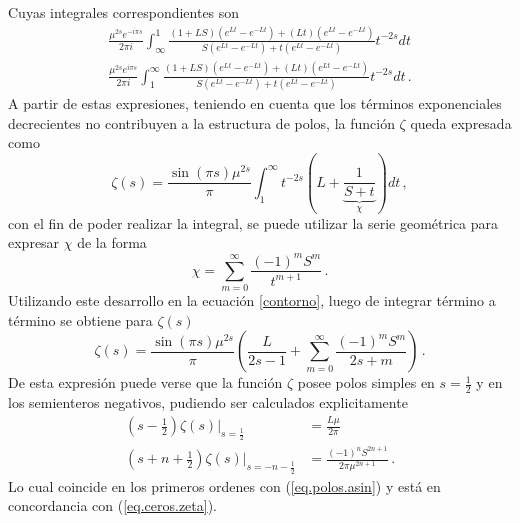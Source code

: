 Cuyas integrales correspondientes son
\begin{align}
\label{eq.tirados}
\frac{\mu ^{2s} e ^{-i \pi s}}{2 \pi i} \int _{\infty} ^{1} 
	\frac{(1+L S) \left( e^{L t} - e ^{- L t} \right) +
			(L t) \left( e ^{L t} - e^{- L t} \right)
			}
			{S \left( e ^{L t} - e ^{- L t} \right) + 
			t \left( e ^{L t} - e ^{-L t} \right)}
			t ^{-2s} dt 
\nonumber			
\\[7pt]
\frac{\mu ^{2s} e ^{i \pi s}}{2 \pi i} \int _{1} ^{\infty} 
	\frac{(1+L S) \left( e^{L t} - e ^{- L t} \right) +
			(L t) \left( e ^{L t} - e^{- L t} \right)
			}
			{S \left( e ^{L t} - e ^{- L t} \right) + 
			t \left( e ^{L t} - e ^{-L t} \right)}
			t ^{-2s} dt
			\, .
\end{align}
A partir de estas expresiones, teniendo en cuenta que los términos exponenciales decrecientes no contribuyen a la estructura de polos, la función $\zeta$ queda expresada como
\begin{equation}
	\zeta  (s) = 
    \frac{ \sin (\pi s) \mu ^{2s}}{ \pi } 
    \int _1 ^{\infty} 
    t^{-2s}
    \left(
    	L + 
	    \underbrace
    	{
		\frac{1}{S + t}   
		} _{\chi} 
	\right)
    dt  \,  ,
\label{contorno}
\end{equation}
con el fin de poder realizar la integral, se puede utilizar la serie geométrica para expresar $\chi$ de la forma
\begin{equation}
    \chi =   \sum _{m=0} ^{\infty} \frac{(-1) ^{m} S ^{m} }{t ^{m+1}}
    \, .
\label{eq:chi}
\end{equation}
Utilizando este desarrollo en la ecuación \eqref{contorno}, luego de integrar término a término se obtiene para $\zeta (s)$
\begin{equation}\label{eq.seta}
    \zeta  (s) = 
    \frac{ \sin(\pi s) \mu ^{2s }}{\pi } 
    \left(
    \frac{L}{2s-1} + 
    \sum _{m=0} ^{\infty}
    \frac{(-1) ^{m} S ^{m} }{2s+m}
    \right) \, .
\end{equation}
De esta expresión puede verse que la función $\zeta$ posee polos simples en $s=\frac{1}{2}$ y en los semienteros negativos, pudiendo ser calculados explicitamente
\begin{equation}
\begin{aligned}
\left(s-\frac{1}{2} \right) \zeta(s) |_{s=\frac{1}{2}} &= \frac{L \mu }{2 \pi}   \\
\left( s + n + \frac{1}{2} \right)
\zeta (s ) |_{s= -n - \frac{1}{2}}  &= \frac{ (-1) ^n S ^{2n+1}  }{2 \pi \mu ^{2n + 1}} 
\, .
\end{aligned}
\label{eq.polos.complejo}
\end{equation}
Lo cual coincide en los primeros ordenes con (\ref{eq.polos.asin}) y está en concordancia  con (\ref{eq.ceros.zeta}).

